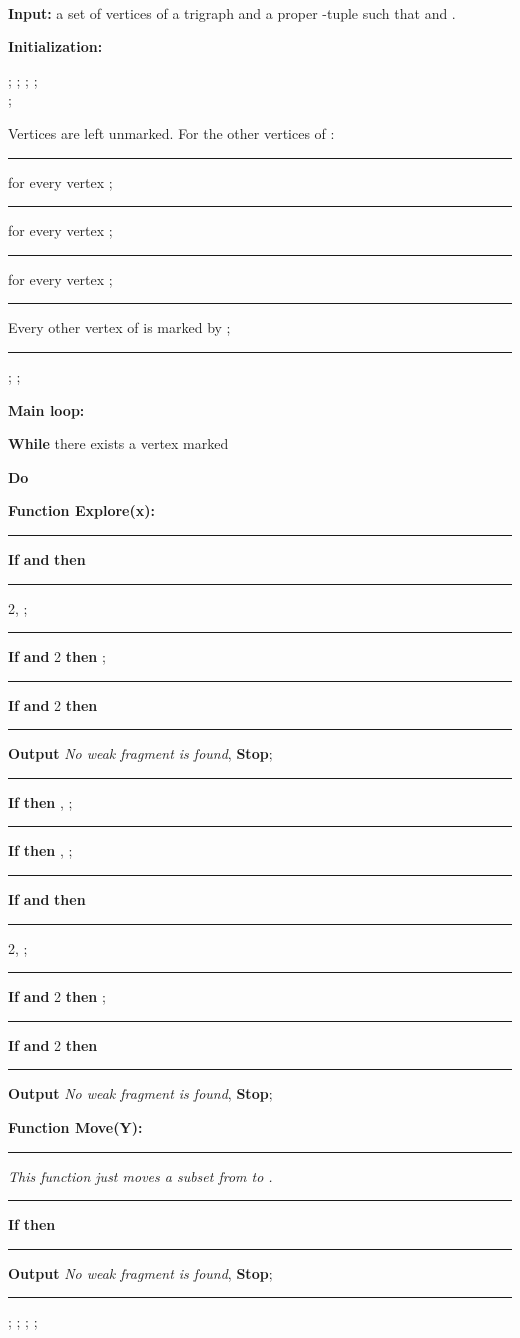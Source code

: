 \documentclass[11 pt] {article}
\newcounter{claim}
\newcommand{\Proof}{\setcounter{claim}{0}\noindent{\bf Proof.}\ \ }
\begin{document}
\Proof
\begin{table}{\small\label{algoM}
\begin{description}
\item{\bf Input:}  a  set of vertices of a trigraph  and a proper -tuple  such
  that  and .

\item{\bf Initialization:}

; ; 
;  ;\\
;


Vertices  are left unmarked. For the other vertices of :

\rule{1em}{0ex} for every vertex ;

\rule{1em}{0ex} for every vertex ;

\rule{1em}{0ex} for every vertex ;

\rule{1em}{0ex}Every other vertex of  is marked by ;

\rule{1em}{0ex}; ;



\item{\bf Main loop:}


\textbf{While} there exists a vertex  marked

\textbf{Do} 

\item{\bf Function Explore(x):}


\rule{1em}{0ex}\textbf{If} 
 \textbf{and}  \textbf{then}

\rule{2em}{0ex}2, ;

\rule{1em}{0ex}\textbf{If}  \textbf{and}
2 \textbf{then}  
;

\rule{1em}{0ex}\textbf{If}  \textbf{and}
2 \textbf{then}\\
\rule{2em}{0ex}{\textbf{Output} {\it No weak fragment is found}}, 
\textbf{Stop};


\rule{1em}{0ex}\textbf{If}  \textbf{then}  
, ;

\rule{1em}{0ex}\textbf{If}  \textbf{then}  
, ;

\rule{1em}{0ex}\textbf{If}  \textbf{and}
 \textbf{then} 

\rule{2em}{0ex}2, ;

\rule{1em}{0ex}\textbf{If}  \textbf{and} 2 \textbf{then} 
;

\rule{1em}{0ex}\textbf{If}  \textbf{and} 2 \textbf{then} \\
\rule{2em}{0ex}{\textbf{Output} {\it No weak fragment is found}}, 
\textbf{Stop};

\item{\bf Function Move(Y):}

\rule{1em}{0ex}{\it This function just moves a subset  from  to . }

\rule{1em}{0ex}\textbf{If}  \textbf{then} \\
\rule{2em}{0ex}{\textbf{Output} {\it No weak fragment is found}}, 
\textbf{Stop};

\rule{1em}{0ex}{;  ;   ;  ;}
\end{description}

\caption{Procedure used in Theorem~\ref{l:forcing}\label{algoM}}}
\end{table}
\end{document}
